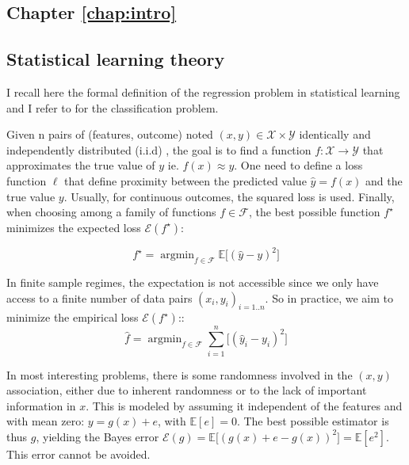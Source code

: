 \documentclass[french,12pt,twoside,a4paper]{book}
\newcommand{\highlight}[2]{\colorbox{#1!17}{$\displaystyle #2$}}
\renewcommand{\highlight}[2]{\colorbox{#1!17}{#2}}
\DeclareMathOperator*{\argmin}{argmin} \def\mycitecolor{green!50!black}
\let\fontnumber\relax
\renewcommand{\thesection}{\fontnumber{\color{chaptercolor}\arabic{chapter}.}\arabic{section}}
\renewcommand{\thesubsection}{\fontnumber{\color{chaptercolor}\arabic{chapter}.}\arabic{section}.\arabic{subsection}}
\begin{document}
\clearpage
\begin{appendices}
  \renewcommand{\thechapter}{\Alph{chapter}} %
  \renewcommand{\thesection}{\thechapter.\arabic{section}} %
  \renewcommand{\thesubsection}{\thesection.\arabic{subsection}} %

  \chapter{Chapter \ref{chap:intro}}\label{apd:intro}

  \section{Statistical learning theory}\label{apd:intro:statistical_learning}

  I recall here the formal definition of the regression problem in statistical
  learning and I refer to \cite{hastie2009elements} for the classification
  problem.

  Given n pairs of (features,
  outcome) noted $(x, y) \in \mathcal X \times \mathcal{Y}$ identically and
  independently distributed (i.i.d) , the goal is to find a function $f:
    \mathcal{X} \rightarrow \mathcal{Y}$ that approximates the true value of $y$
  ie. $f(x) \approx y$. One need to define a loss function $\ell$ that define
  proximity between the predicted value $\hat{y} = f(x)$ and the true value
  $y$. Usually, for continuous outcomes, the squared loss is used. Finally,
  when choosing among a family of functions $f \in \mathcal{F}$, the best possible function $f^{\star}$
  minimizes the expected loss $\mathcal{E}(f^{\star})$:

  \begin{equation}
    f^{\star} = \argmin_{f \in \mathcal{F}} \mathbb{E} \big [ (\hat{y} - y)^2 \big]
  \end{equation}

  In finite sample regimes, the expectation is not accessible since we only have
  access to a finite number of data pairs ${(x_i, y_i)}_{i=1..n}$. So in
  practice, we aim to minimize the empirical loss $\mathcal{E}(f^{\star})$::
  \begin{equation}
    \hat f = \argmin_{f \in \mathcal{F}} \sum_{i=1}^{n} \big [ (\hat{y}_{i} - y_{i})^2 \big]
  \end{equation}

  In most interesting problems, there is some randomness involved in the $(x,y)$
  association, either due to inherent randomness or to the lack of important
  information in $x$. This is modeled by assuming it independent of the features
  and with mean zero: $y = g(x) + e$, with $\mathbb E[e]=0$. The best possible estimator
  is thus $g$, yielding the Bayes error \highlight{bayes_error}{\color{black} $\mathcal{E}(g) =
      \mathbb{E} \big [ (g(x) + e - g(x))^2 \big]=\mathbb{E}[e^2]$}. This error
  cannot be avoided.


\end{appendices}
\end{document}
